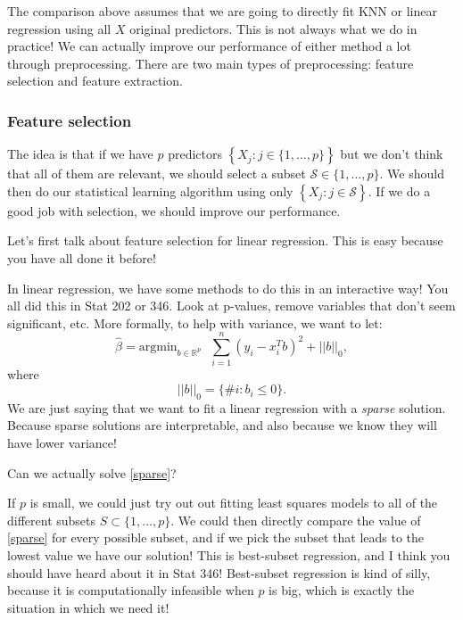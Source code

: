 The comparison above assumes that we are going to directly fit KNN or linear regression using all $X$ original predictors. This is not always what we do in practice! We can actually improve our performance of either method a lot through preprocessing. There are two main types of preprocessing: feature selection and feature extraction. 

\subsubsection{Feature selection}

The idea is that if we have $p$ predictors $\left\{X_j : j \in \{1,\ldots,p\}\right\}$ but we don't think that all of them are relevant, we should select a subset $\mathcal{S} \in \{1,\ldots,p\}$. We should then do our statistical learning algorithm using only $\left\{X_j : j \in \mathcal{S} \right\}$. If we do a good job with selection, we should improve our performance. 

Let's first talk about feature selection for linear regression. This is easy because you have all done it before! 

In linear regression, we have some methods to do this in an interactive way! You all did this in Stat 202 or 346. Look at p-values, remove variables that don't seem significant, etc.
More formally, to help with variance, we want to let:
\begin{equation}
\label{sparse}	
\hat{\beta} = \mathrm{argmin}_{b \in \mathbb{R}^p} \ \ \ \sum_{i=1}^n \left( y_i - x_i^T b \right)^2 + ||b||_0,
\end{equation}
where
$$
||b||_0 = \{ \#i : b_i \leq 0 \}.
$$
We are just saying that we want to fit a linear regression with a \emph{sparse} solution. Because sparse solutions are interpretable, and also because we know they will have lower variance! 

Can we actually solve \eqref{sparse}? 

If $p$ is small, we could just try out out fitting least squares models to all of the different subsets $S \subset \{1,\ldots,p\}$. We could then directly compare the value of  \eqref{sparse} for every possible subset, and if we pick the subset that leads to the lowest value we have our solution! This is best-subset regression, and I think you should have heard about it in Stat 346! Best-subset regression is kind of silly, because it is computationally infeasible when $p$ is big, which is exactly the situation in which we need it! 

